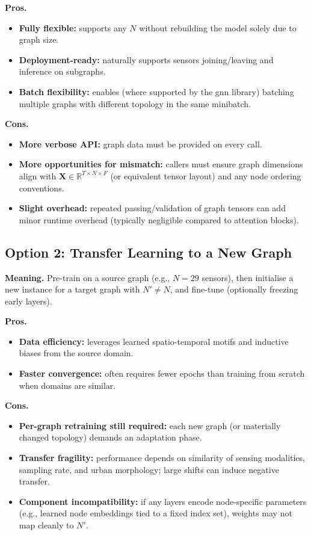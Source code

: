 \textbf{Pros.}
\begin{itemize}
    \item \textbf{Fully flexible:} supports any $N$ without rebuilding the model solely due to graph size.
    \item \textbf{Deployment-ready:} naturally supports sensors joining/leaving and inference on subgraphs.
    \item \textbf{Batch flexibility:} enables (where supported by the \gls{gnn} library) batching multiple graphs with different topology in the same minibatch.
\end{itemize}

\textbf{Cons.}
\begin{itemize}
    \item \textbf{More verbose API:} graph data must be provided on every call.
    \item \textbf{More opportunities for mismatch:} callers must ensure graph dimensions align with $\mathbf{X}\in\mathbb{R}^{T\times N\times F}$ (or equivalent tensor layout) and any node ordering conventions.
    \item \textbf{Slight overhead:} repeated passing/validation of graph tensors can add minor runtime overhead (typically negligible compared to attention blocks).
\end{itemize}

\subsection{Option 2: Transfer Learning to a New Graph}
\label{subsec:appendix-option2-transfer}

\textbf{Meaning.} Pre-train on a source graph (e.g., $N=29$ sensors), then initialise a new instance for a target graph with $N'\neq N$, and fine-tune (optionally freezing early layers).

\textbf{Pros.}
\begin{itemize}
    \item \textbf{Data efficiency:} leverages learned spatio-temporal motifs and inductive biases from the source domain.
    \item \textbf{Faster convergence:} often requires fewer epochs than training from scratch when domains are similar.
\end{itemize}

\textbf{Cons.}
\begin{itemize}
    \item \textbf{Per-graph retraining still required:} each new graph (or materially changed topology) demands an adaptation phase.
    \item \textbf{Transfer fragility:} performance depends on similarity of sensing modalities, sampling rate, and urban morphology; large shifts can induce negative transfer.
    \item \textbf{Component incompatibility:} if any layers encode node-specific parameters (e.g., learned node embeddings tied to a fixed index set), weights may not map cleanly to $N'$.
\end{itemize}

